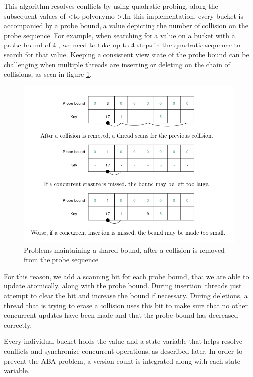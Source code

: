 This algorithm resolves conflicts by using quadratic probing, along the subsequent values of <to polyonymo >.In this implementation, every bucket is accompanied by a probe bound, a value depicting the number of collision on the probe sequence. For example, when searching for a value on a bucket with a probe bound of 4 , we need to take up to 4 steps in the quadratic sequence to search for that value. Keeping a consistent view state of the probe bound can be challenging when multiple threads are inserting or deleting on the chain of collisions, as seen in figure \ref{non_blocking_1}.

\begin{figure}
 \centering
  \includegraphics[scale=0.5]{non_blocking_1.png}
\caption{Problems maintaining a shared bound, after a collision is removed from the probe sequence}
\label{non_blocking_1}
\end{figure}

For this reason, we add a scanning bit for each probe bound, that we are able to update atomically, along with the probe bound. During insertion, threads just attempt to clear the bit and increase the bound if necessary. During deletions, a thread that is trying to erase a collision uses this bit to make sure that no other concurrent  updates have been made and that the probe bound has decreased correctly.

Every individual bucket holds the value and a state variable that helps resolve conflicts and synchronize concurrent operations, as described later. In order to prevent the ABA  problem, a version count is integrated along with each state variable.

